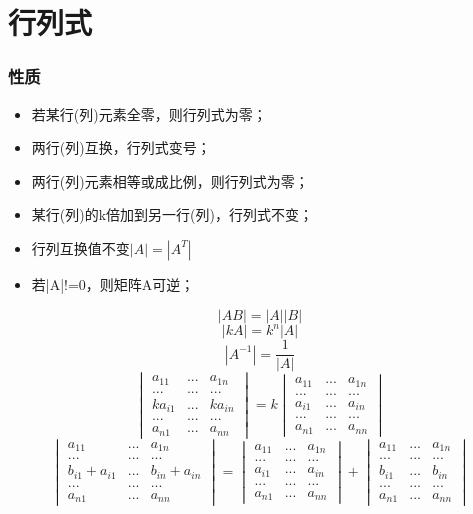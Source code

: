 
\chapter{行列式}

\subsection{性质}
\begin{itemize}
    \item 若某行(列)元素全零，则行列式为零；
    \item 两行(列)互换，行列式变号；
    \item 两行(列)元素相等或成比例，则行列式为零；
    \item 某行(列)的k倍加到另一行(列)，行列式不变；
    \item 行列互换值不变\(|A| = |A^T|\)
    \item 若|A|!=0，则矩阵A可逆；
\end{itemize}
\[|AB| = |A||B|\]
\[|kA| = k^n|A|\]
\[|A^{-1}| = \dfrac{1}{|A|}\]
\[\begin{vmatrix}
a_{11} & ... & a_{1n} \\
... & ... & ... \\
ka_{i1} & ... & ka_{in} \\
... & ... & ... \\
a_{n1} & ... & a_{nn}
\end{vmatrix} = k
\begin{vmatrix}
a_{11} & ... & a_{1n} \\
... & ... & ... \\
a_{i1} & ... & a_{in} \\
... & ... & ... \\
a_{n1} & ... & a_{nn}
\end{vmatrix}\]
\[\begin{vmatrix}
a_{11} & ... & a_{1n} \\
... & ... & ... \\
b_{i1} + a_{i1} & ... & b_{in} + a_{in} \\
... & ... & ... \\
a_{n1} & ... & a_{nn}
\end{vmatrix} = 
\begin{vmatrix}
a_{11} & ... & a_{1n} \\
... & ... & ... \\
a_{i1} & ... & a_{in} \\
... & ... & ... \\
a_{n1} & ... & a_{nn}
\end{vmatrix} + 
\begin{vmatrix}
a_{11} & ... & a_{1n} \\
... & ... & ... \\
b_{i1} & ... & b_{in} \\
... & ... & ... \\
a_{n1} & ... & a_{nn}
\end{vmatrix}\]



